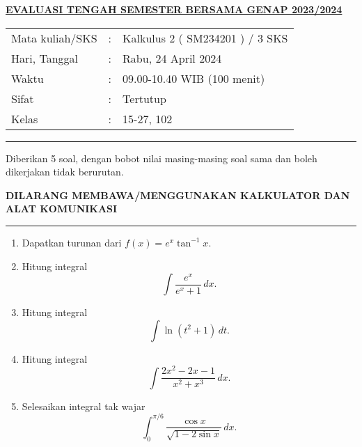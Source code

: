 \documentclass[11pt,openany,a4paper]{article}
\begin{document}
    \newpage
    \pagestyle{problems}

    \begin{center}
	{\underline{\textbf{\MakeUppercase{Evaluasi Tengah Semester Bersama Genap 2023/2024}}}}
    \end{center}

    \begin{center}
	\begin{tabular}{lcl}
		Mata kuliah/SKS & : & Kalkulus 2 ( SM234201 ) / 3 SKS\\
		Hari, Tanggal & : & Rabu, 24 April 2024\\
		Waktu & : & 09.00-10.40 WIB (100 menit)\\
		Sifat & : & Tertutup\\
		Kelas & : & 15-27, 102
	\end{tabular}
    \end{center}
	
    \noindent\rule{\textwidth}{2.pt}
	
    \setlength{\parindent}{5pt}
    \par Diberikan 5 soal, dengan bobot nilai masing-masing soal sama dan boleh dikerjakan tidak berurutan.
    \setlength{\parindent}{5pt}
    \setlength{\parindent}{5pt}
    {\small
    \par \textbf{\MakeUppercase{Dilarang membawa/menggunakan kalkulator dan alat komunikasi}}
    }
    \par {}
	
    \noindent\rule{\textwidth}{2.pt}
	
\begin{enumerate}
  \item Dapatkan turunan dari \( f(x) = e^x \tan^{-1} x \).
  
  \item Hitung integral
  \[
  \int \frac{e^x}{e^x + 1} \, dx.
  \]
  
  \item Hitung integral
  \[
  \int \ln(t^2 + 1) \, dt.
  \]
  
  \item Hitung integral
  \[
  \int \frac{2x^2 - 2x - 1}{x^2 + x^3} \, dx.
  \]
  
  \item Selesaikan integral tak wajar
  \[
  \int_0^{\pi/6} \frac{\cos x}{\sqrt{1 - 2 \sin x}} \, dx.
  \]
\end{enumerate}
	
\end{document}
